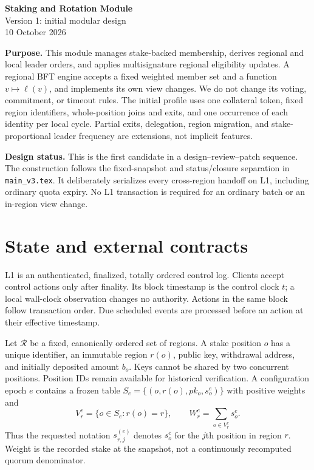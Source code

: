 \documentclass[11pt,a4paper]{article}
\begin{document}
\begin{center}
{\Large\bfseries Staking and Rotation Module}\\[4pt]
{\large Version 1: initial modular design}\\[3pt]
10 October 2026
\end{center}

\textbf{Purpose.} This module manages stake-backed membership, derives
regional and local leader orders, and applies multisignature regional
eligibility updates. A regional BFT engine accepts a fixed weighted member
set and a function $v\mapsto\ell(v)$, and implements its own view changes.
We do not change its voting, commitment, or timeout rules. The initial
profile uses one collateral token, fixed region identifiers, whole-position
joins and exits, and one occurrence of each identity per local cycle.
Partial exits, delegation, region migration, and stake-proportional leader
frequency are extensions, not implicit features.

\textbf{Design status.} This is the first candidate in a design--review--patch
sequence. The construction follows the fixed-snapshot and status/closure
separation in \texttt{main\_v3.tex}. It deliberately serializes every
cross-region handoff on L1, including ordinary quota expiry. No L1
transaction is required for an ordinary batch or an in-region view change.

\section{State and external contracts}
\label{sec:interfaces}

L1 is an authenticated, finalized, totally ordered control log. Clients
accept control actions only after finality. Its block timestamp is the
control clock $t$; a local wall-clock observation changes no authority.
Actions in the same block follow transaction order. Due scheduled events
are processed before an action at their effective timestamp.

Let $\mathcal R$ be a fixed, canonically ordered set of regions. A stake
position $o$ has a unique identifier, an immutable region $r(o)$, public
key, withdrawal address, and initially deposited amount $b_o$. Keys cannot
be shared by two concurrent positions. Position IDs remain available for
historical verification. A configuration epoch $e$ contains a frozen table
$S_e=\{(o,r(o),pk_o,s_o^e)\}$ with positive weights and
\[
 V_r^e=\{o\in S_e:r(o)=r\},\qquad
 W_r^e=\sum_{o\in V_r^e}s_o^e.
\]
Thus the requested notation $s_{r,j}^{(e)}$ denotes $s_o^e$ for the
$j$th position in region $r$. Weight is the recorded stake at the snapshot,
not a continuously recomputed quorum denominator.
\end{document}
